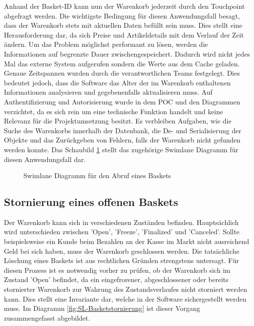 Anhand der Basket-ID kann nun der Warenkorb jederzeit durch den Touchpoint abgefragt werden. Die wichtigste Bedingung für diesen Anwendungsfall besagt, dass der Warenkorb stets mit aktuellen Daten befüllt sein muss. Dies stellt eine Herausforderung dar, da sich Preise und Artikeldetails mit dem Verlauf der Zeit ändern. Um das Problem möglichst performant zu lösen, werden die Informationen auf begrenzte Dauer zwischengespeichert. Dadurch wird nicht jedes Mal das externe System aufgerufen sondern die Werte aus dem Cache geladen. Genaue Zeitspannen wurden durch die verantwortlichen Teams festgelegt. Dies bedeutet jedoch, dass die Software das Alter der im Warenkorb enthaltenen Informationen analysieren und gegebenenfalls aktualisieren muss. Auf Authentifizierung und Autorisierung wurde in dem POC und den Diagrammen verzichtet, da es sich rein um eine technische Funktion handelt und keine Relevanz für die Projektumsetzung besitzt. Es verbleiben Aufgaben, wie die Suche des Warenkorbs innerhalb der Datenbank, die De- und Serialisierung der Objekte und das Zurückgeben von Fehlern, falls der Warenkorb nicht gefunden werden konnte. Das Schaubild \ref{fig:SL-Basketabruf} stellt das zugehörige Swimlane Diagramm für diesen Anwendungsfall dar.

\begin{figure}[htbp]
	\centering
	
	\caption{Swimlane Diagramm für den Abruf eines Baskets}
	\label{fig:SL-Basketabruf}
\end{figure}

\subsection{Stornierung eines offenen Baskets}

Der Warenkorb kann sich in verschiedenen Zuständen befinden. Hauptsächlich wird unterschieden zwischen 'Open', 'Freeze', 'Finalized' und 'Canceled'. Sollte beispielsweise ein Kunde beim Bezahlen an der Kasse im Markt nicht ausreichend Geld bei sich haben, muss der Warenkorb geschlossen werden. Die tatsächliche Löschung eines Baskets ist aus rechtlichen Gründen strengstens untersagt. Für diesen Prozess ist es notwendig vorher zu prüfen, ob der Warenkorb sich im Zustand 'Open' befindet, da ein eingefrorener, abgeschlossener oder bereits stornierter Warenkorb zur Wahrung des Zustandsverlaufes nicht storniert werden kann. Dies stellt eine Invariante dar, welche in der Software sichergestellt werden muss. Im Diagramm \ref{fig:SL-Basketstornierung} ist dieser Vorgang zusammengefasst abgebildet.

